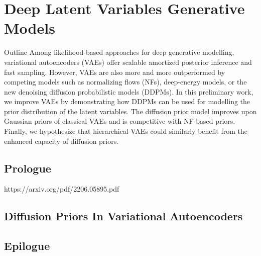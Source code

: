 \chapter{Deep Latent Variables Generative Models}\label{ch:03}

\begin{remark}{Outline}
Among likelihood-based approaches for deep generative modelling, variational autoencoders (VAEs) offer scalable amortized posterior inference and fast sampling. However, VAEs are also more and more outperformed by competing models such as normalizing flows (NFs), deep-energy models, or the new denoising diffusion probabilistic models (DDPMs).
In this preliminary work, we improve VAEs by demonstrating how DDPMs can be used for modelling the prior distribution of the latent variables. The diffusion prior model improves upon Gaussian priors of classical VAEs and is competitive with NF-based priors.
Finally, we hypothesize that hierarchical VAEs could similarly benefit from the enhanced capacity of diffusion priors.
\end{remark}
\section{Prologue}
https://arxiv.org/pdf/2206.05895.pdf
\\
\section{Diffusion Priors In Variational Autoencoders}


\section{Epilogue}
